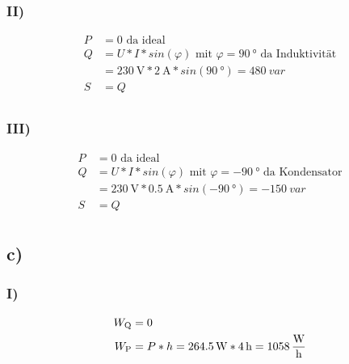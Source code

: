 \documentclass[../../document.tex]{subfiles}
\begin{document}
\subsubsection*{II)}

\begin{equation*}
    \begin{split}
        P &= 0\textrm{ da ideal}\\
        Q &= U * I * sin(\varphi) \textrm{ mit } \varphi = \SI{90}{\degree}\textrm{ da Induktivität}\\
        &= \SI{230}{\volt} * \SI{2}{\ampere} * sin(\SI{90}{\degree}) = \SI{480}{var}\\
        S &= Q\\
    \end{split}
\end{equation*}

\subsubsection*{III)}

\begin{equation*}
    \begin{split}
        P &= 0\textrm{ da ideal}\\
        Q &= U * I * sin(\varphi) \textrm{ mit } \varphi = \SI{-90}{\degree}\textrm{ da Kondensator}\\
        &= \SI{230}{\volt} * \SI{0,5}{\ampere} * sin(\SI{-90}{\degree}) = \SI{-150}{var}\\
        S &= Q\\
    \end{split}
\end{equation*}

\subsection*{c)}

\subsubsection*{I)}

\begin{equation*}
    \begin{split}
        W_{\textrm{Q}} &= 0\\
        W_{\textrm{P}} &= P * h = \SI{264,5}{\watt} * \SI{4}{\hour} = \SI{1058}{\frac{\watt}{\hour}}\\
    \end{split}
\end{equation*}
\end{document}

